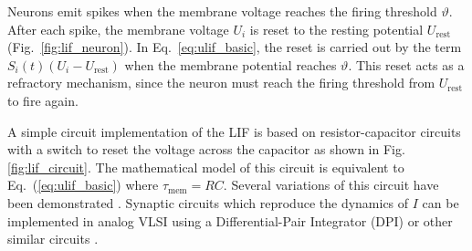 \documentclass[english]{article}
\renewcommand{\refeq}[1]{{Eq.~(\ref{#1})}}
\newcommand{\reffig}[1]{{Fig.~\ref{#1}}}
\renewcommand{\cite}{\citep}
\begin{document}
Neurons emit spikes when the membrane voltage reaches the firing threshold $\vartheta$.
After each spike, the membrane voltage $U_i$ is reset to the resting potential $U_\mathrm{rest}$ (\reffig{fig:lif_neuron}).
In Eq.~\eqref{eq:ulif_basic}, the reset is carried out by the term $S_i(t)(U_i-U_\mathrm{rest})$ when the membrane potential reaches $\vartheta$. This reset acts as a refractory mechanism, since the neuron must reach the firing threshold from $U_\mathrm{rest}$ to fire again. 

A simple circuit implementation of the \ac{LIF} is based on resistor-capacitor circuits with a switch to reset the voltage across the capacitor as shown in Fig. \ref{fig:lif_circuit}. The mathematical model of this circuit is equivalent to \refeq{eq:ulif_basic} where $\tau_\mathrm{mem}=RC$. Several variations of this circuit have been demonstrated \cite{Indiveri_etal11_neursili}.
Synaptic circuits which reproduce the dynamics of $I$ can be implemented in analog VLSI using a Differential-Pair Integrator (DPI) or other similar circuits \cite{Bartolozzi_Indiveri07_synadyna}.
\end{document}

